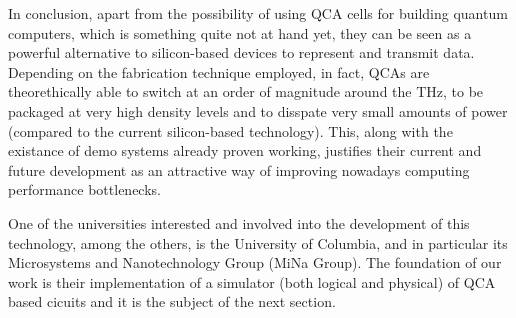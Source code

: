 In conclusion, apart from the possibility of using QCA cells for building quantum computers, which is something quite not at hand yet, they can be seen as a powerful alternative to silicon-based devices to represent and transmit data. Depending on the fabrication technique employed, in fact, QCAs are theorethically able to switch at an order of magnitude around the THz, to be packaged at very high density levels and to disspate very small amounts of power (compared to the current silicon-based technology). This, along with the existance of demo systems already proven working, justifies their current and future development as an attractive way of improving nowadays computing performance bottlenecks.

One of the universities interested and involved into the development of this technology, among the others, is the University of Columbia, and in particular its Microsystems and Nanotechnology Group (MiNa Group). The foundation of our work is their implementation of a simulator (both logical and physical) of QCA based cicuits and it is the subject of the next section.

